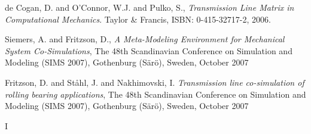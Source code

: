 \begin{thebibliography}{14}
	de Cogan, D. and O'Connor, W.J. and Pulko, S.,
	{\em Transmission Line Matrix in Computational Mechanics}.
	Taylor \& Francis, ISBN: 0-415-32717-2, 2006.

 Siemers, A. and Fritzson, D.,
	{\em A Meta-Modeling Environment for Mechanical System
	Co-Simulations}, The 48th Scandinavian Conference on
	Simulation and Modeling (SIMS 2007), Gothenburg
	(S\"{a}r\"{o}), Sweden, October 2007

 Fritzson, D. and St{\aa}hl,
	J. and Nakhimovski, I.  {\em Transmission line co-simulation
	of rolling bearing applications}, The 48th Scandinavian
	Conference on Simulation and Modeling (SIMS 2007), Gothenburg
	(S\"{a}r\"{o}), Sweden, October 2007

I








\end{thebibliography}
